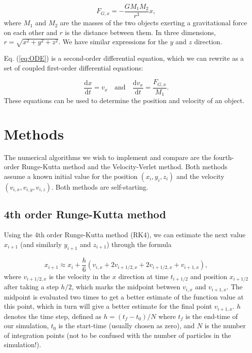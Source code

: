 \documentclass{article}
\begin{document}
\begin{multicols}{2}
\begin{equation}\label{eq:force_comp}
	F_{G,x} = - \frac{G M_1 M_2}{r^3}x,
\end{equation}
where $M_1$ and $M_2$ are the masses of the two objects exerting a gravitational force on each other and $r$ is the distance between them. In three dimensions, $r = \sqrt{x^2 + y^2 + z^2}$. We have similar expressions for the $y$ and $z$ direction.

Eq. (\ref{eq:ODE}) is a second-order differential equation, which we can rewrite as a set of coupled first-order differential equations:

\begin{equation}
	\frac{\mathrm{d}x}{\mathrm{d}t} = v_x  \quad \mathrm{and} \quad \frac{\mathrm{d}v_x}{\mathrm{d}t} = \frac{F_{G,x}}{M_1}.
\end{equation}
These equations can be used to determine the position and velocity of an object.




\section{Methods}\label{sec:methods}

The numerical algorithms we wish to implement and compare are the fourth-order Runge-Kutta method and the Velocity-Verlet method. Both methods assume a known initial value for the position $(x_i,y_i,z_i)$ and the velocity $(v_{i,x},v_{i,y},v_{i,z})$. Both methods are self-starting. 


\subsection{4th order Runge-Kutta method}\label{sec:RK4}
Using the 4th order Runge-Kutta method (RK4), we can estimate the next value $x_{i+1}$ (and similarly $y_{i+1}$ and $z_{i+1}$) through the formula

\begin{equation}
	x_{i+1} \approx x_i + \frac{h}{6} (v_{i,x} + 2 v_{i + 1/2,x} + 2 v_{i + 1/2,x} + v_{i+1,x}),
\end{equation}
where $v_{i + 1/2,x} $ is the velocity in the $x$ direction at time $t_{i + 1/2}$ and position $x_{i + 1/2}$ after taking a step $h/2$, which marks the midpoint between $v_{i,x}$ and $v_{i+1,x}$. The midpoint is evaluated two times to get a better estimate of the function value at this point, which in turn will give a better estimate for the final point $v_{i+1,x}$. $h$ denotes the time step, defined as $h = (t_f - t_0)/N$ where $t_f$ is the end-time of our simulation, $t_0$ is the start-time (usually chosen as zero), and $N$ is the number of integration points (not to be confused with the number of particles in the simulation!).


\end{multicols}
\end{document}
